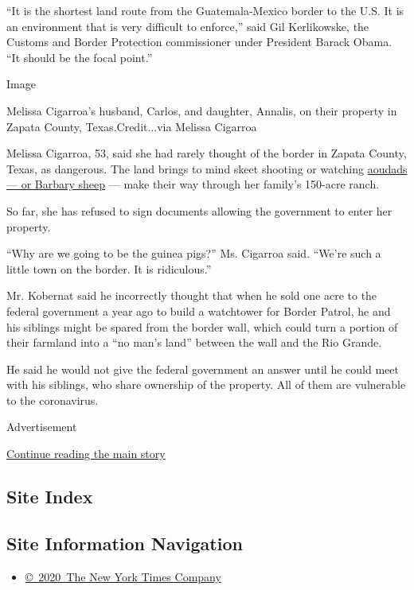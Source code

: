 ``It is the shortest land route from the Guatemala-Mexico border to the
U.S. It is an environment that is very difficult to enforce,'' said Gil
Kerlikowske, the Customs and Border Protection commissioner under
President Barack Obama. ``It should be the focal point.''

Image

Melissa Cigarroa's husband, Carlos, and daughter, Annalis, on their
property in Zapata County, Texas.Credit...via Melissa Cigarroa

Melissa Cigarroa, 53, said she had rarely thought of the border in
Zapata County, Texas, as dangerous. The land brings to mind skeet
shooting or watching
\href{https://www.britannica.com/animal/aoudad}{aoudads --- or Barbary
sheep} --- make their way through her family's 150-acre ranch.

So far, she has refused to sign documents allowing the government to
enter her property.

``Why are we going to be the guinea pigs?'' Ms. Cigarroa said. ``We're
such a little town on the border. It is ridiculous.''

Mr. Kobernat said he incorrectly thought that when he sold one acre to
the federal government a year ago to build a watchtower for Border
Patrol, he and his siblings might be spared from the border wall, which
could turn a portion of their farmland into a ``no man's land'' between
the wall and the Rio Grande.

He said he would not give the federal government an answer until he
could meet with his siblings, who share ownership of the property. All
of them are vulnerable to the coronavirus.

Advertisement

\protect\hyperlink{after-bottom}{Continue reading the main story}

\hypertarget{site-index}{%
\subsection{Site Index}\label{site-index}}

\hypertarget{site-information-navigation}{%
\subsection{Site Information
Navigation}\label{site-information-navigation}}

\begin{itemize}
\tightlist
\item
  \href{https://help.nytimes3xbfgragh.onion/hc/en-us/articles/115014792127-Copyright-notice}{©~2020~The
  New York Times Company}
\end{itemize}

